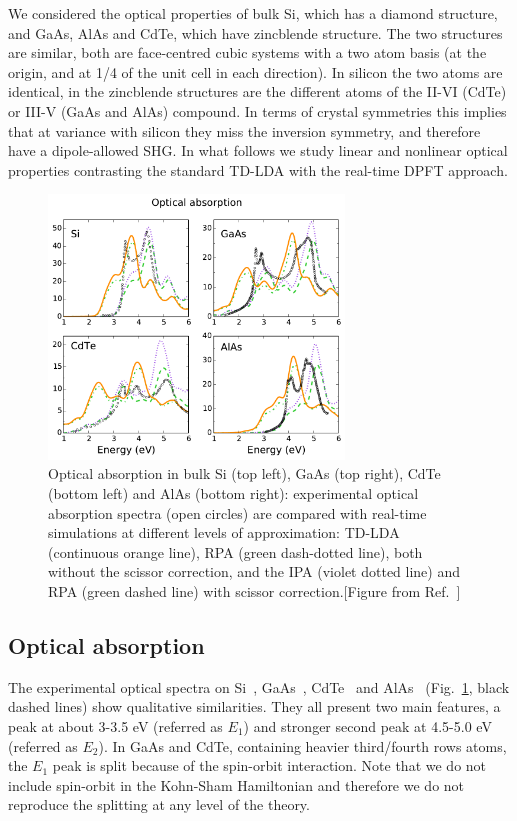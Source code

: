 We considered the optical properties of bulk Si, which has a diamond structure, and GaAs, AlAs and CdTe, which have zincblende structure. The two structures are similar, both are face-centred cubic systems with a two atom basis (at the origin, and at 1/4 of the unit cell in each direction). In silicon the two atoms are identical, in the zincblende structures are the different atoms of the II-VI (CdTe) or III-V (GaAs and AlAs) compound. In terms of crystal symmetries this implies that at variance with silicon they miss the inversion symmetry, and therefore have a dipole-allowed SHG. In what follows we study linear and nonlinear optical properties contrasting the standard TD-LDA with the real-time DPFT approach. 

\begin{figure}[t]
\centering
\includegraphics[width=0.7\textwidth]{Figures/Abs.pdf}
\caption{\footnotesize{Optical absorption in bulk Si (top left), GaAs (top right), CdTe (bottom left) and AlAs (bottom right): experimental optical absorption spectra (open circles) are compared with real-time simulations at different levels of approximation: TD-LDA (continuous orange line), RPA (green dash-dotted line), both without the scissor correction, and the IPA (violet dotted line) and RPA (green dashed line) with scissor correction.[Figure from Ref.~\cite{gruningtddf1}]}} \label{fg:epsblk}
\end{figure}


\subsection{Optical absorption}

The experimental optical spectra on Si~\cite{PhysRevB.36.4821}, GaAs~\cite{PhysRevB.35.9174}, CdTe~\cite{Adachi} and AlAs~\cite{GARRIGA} (Fig.~\ref{fg:epsblk}, black dashed lines) show qualitative similarities. They all present two main features, a peak at about 3-3.5 eV (referred as $E_1$) and stronger second peak at 4.5-5.0 eV (referred as $E_2$). In GaAs and CdTe, containing heavier third/fourth rows atoms, the $E_1$ peak is split because of the spin-orbit interaction.
Note that we do not include spin-orbit in the Kohn-Sham Hamiltonian and therefore we do not reproduce the splitting at any level of the theory. 

